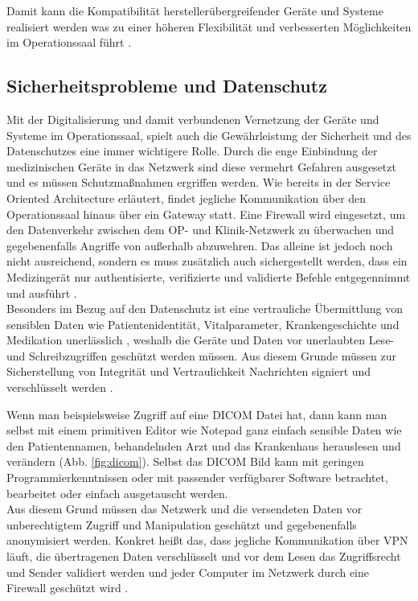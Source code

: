 Damit kann die Kompatibilität herstellerübergreifender Geräte und Systeme realisiert werden was zu einer höheren Flexibilität und verbesserten Möglichkeiten im Operationssaal führt \cite{DerDigitaleOperationssaal}.

\subsection{Sicherheitsprobleme und Datenschutz}

Mit der Digitalisierung und damit verbundenen Vernetzung der Geräte und Systeme im Operationssaal, spielt auch die Gewährleistung der Sicherheit und des Datenschutzes eine immer wichtigere Rolle.
Durch die enge Einbindung der medizinischen Geräte in das Netzwerk sind diese vermehrt Gefahren ausgesetzt und es müssen Schutzmaßnahmen ergriffen werden. Wie bereits in der Service Oriented Architecture erläutert, findet jegliche Kommunikation über den Operationssaal hinaus über ein Gateway statt. Eine Firewall wird eingesetzt, um den Datenverkehr zwischen dem OP- und Klinik-Netzwerk zu überwachen und gegebenenfalls Angriffe von außerhalb abzuwehren. Das alleine ist jedoch noch nicht ausreichend, sondern es muss zusätzlich auch sichergestellt werden, dass \glqq ein Medizingerät nur authentisierte, verifizierte und validierte Befehle entgegennimmt und ausführt\grqq{} \cite{DerDigitaleOperationssaal}. \\
Besonders im Bezug auf den Datenschutz ist eine \glqq vertrauliche Übermittlung von sensiblen Daten wie Patientenidentität, Vitalparameter, Krankengeschichte und Medikation unerlässlich\grqq{} \cite{DerDigitaleOperationssaal}, weshalb die Geräte und Daten vor unerlaubten Lese- und Schreibzugriffen geschützt werden müssen. Aus diesem Grunde müssen zur Sicherstellung von Integrität und Vertraulichkeit Nachrichten signiert und verschlüsselt werden \cite{DerDigitaleOperationssaal}. 

Wenn man beispielsweise Zugriff auf eine DICOM Datei hat, dann kann man selbst mit einem primitiven Editor wie Notepad ganz einfach sensible Daten wie den Patientennamen, behandelnden Arzt und das Krankenhaus herauslesen und verändern (Abb. \ref{fig:dicom}). Selbst das DICOM Bild kann mit geringen Programmierkenntnissen oder mit passender verfügbarer Software betrachtet, bearbeitet oder einfach ausgetauscht werden.\\
Aus diesem Grund müssen das Netzwerk und die versendeten Daten vor unberechtigtem Zugriff und Manipulation geschützt und gegebenenfalls anonymisiert werden. Konkret heißt das, dass jegliche Kommunikation über VPN läuft, die übertragenen Daten verschlüsselt und vor dem Lesen das Zugriffsrecht und Sender validiert werden und jeder Computer im Netzwerk durch eine Firewall geschützt wird \cite{DICOM}. 

